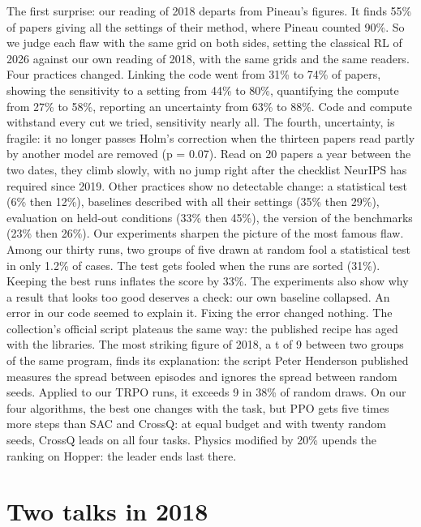\documentclass[11pt,a4paper]{article}
\begin{document}
The first surprise: our reading of 2018 departs from Pineau's figures.
It finds 55\% of papers giving all the settings of their method, where
Pineau counted 90\%. So we judge each flaw with the same grid on both
sides, setting the classical RL of 2026 against our own reading of 2018,
with the same grids and the same readers. Four practices changed.
Linking the code went from 31\% to 74\% of papers, showing the
sensitivity to a setting from 44\% to 80\%, quantifying the compute from
27\% to 58\%, reporting an uncertainty from 63\% to 88\%. Code and
compute withstand every cut we tried, sensitivity nearly all. The
fourth, uncertainty, is fragile: it no longer passes Holm's correction
when the thirteen papers read partly by another model are removed (p =
0.07). Read on 20 papers a year between the two dates, they climb
slowly, with no jump right after the checklist NeurIPS has required
since 2019. Other practices show no detectable change: a statistical
test (6\% then 12\%), baselines described with all their settings (35\%
then 29\%), evaluation on held-out conditions (33\% then 45\%), the
version of the benchmarks (23\% then 26\%). Our experiments sharpen the
picture of the most famous flaw. Among our thirty runs, two groups of
five drawn at random fool a statistical test in only 1.2\% of cases. The
test gets fooled when the runs are sorted (31\%). Keeping the best runs
inflates the score by 33\%. The experiments also show why a result that
looks too good deserves a check: our own baseline collapsed. An error in
our code seemed to explain it. Fixing the error changed nothing. The
collection's official script plateaus the same way: the published recipe
has aged with the libraries. The most striking figure of 2018, a t of 9
between two groups of the same program, finds its explanation: the
script Peter Henderson published measures the spread between episodes
and ignores the spread between random seeds. Applied to our TRPO runs,
it exceeds 9 in 38\% of random draws. On our four algorithms, the best
one changes with the task, but PPO gets five times more steps than SAC
and CrossQ: at equal budget and with twenty random seeds, CrossQ leads
on all four tasks. Physics modified by 20\% upends the ranking on
Hopper: the leader ends last there.

\section{Two talks in 2018}\label{two-talks-in-2018}
\end{document}
